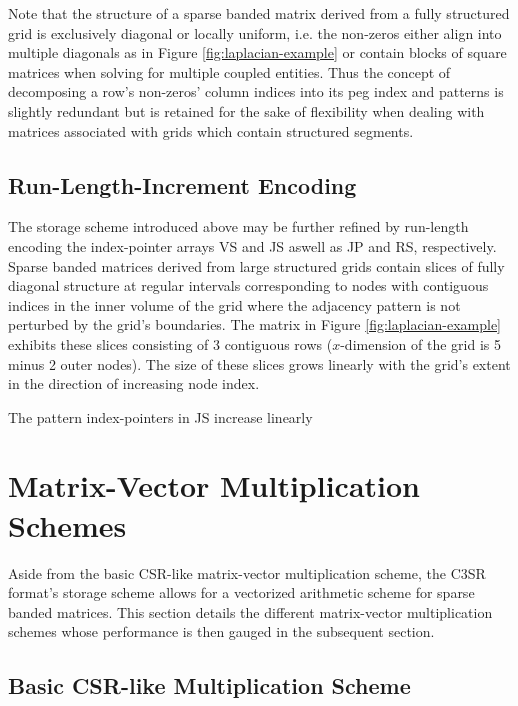     Note that the structure of a sparse banded matrix derived from a fully structured grid is exclusively diagonal or
    locally uniform, i.e. the non-zeros either align into multiple diagonals as in Figure \ref{fig:laplacian-example} or
    contain blocks of square matrices when solving for multiple coupled entities. Thus the concept of decomposing a
    row's non-zeros' column indices into its peg index and patterns is slightly redundant but is retained for the sake
    of flexibility when dealing with matrices associated with grids which contain structured segments.

    \subsection{Run-Length-Increment Encoding}

      The storage scheme introduced above may be further refined by run-length encoding the index-pointer arrays VS and
      JS aswell as JP and RS, respectively. Sparse banded matrices derived from large structured grids contain slices of
      fully diagonal structure at regular intervals corresponding to nodes with contiguous indices in the inner volume
      of the grid where the adjacency pattern is not perturbed by the grid's boundaries. The matrix in Figure
      \ref{fig:laplacian-example} exhibits these slices consisting of 3 contiguous rows ($x$-dimension of the grid is 5
      minus 2 outer nodes). The size of these slices grows linearly with the grid's extent in the direction of
      increasing node index.

      The pattern index-pointers in JS increase linearly

  \section{Matrix-Vector Multiplication Schemes} \label{subsec:matrix-vector-multiplication-schemes}

    Aside from the basic CSR-like matrix-vector multiplication scheme, the C3SR format's storage scheme allows for a
    vectorized arithmetic scheme for sparse banded matrices. This section details the different matrix-vector
    multiplication schemes whose performance is then gauged in the subsequent section.

    \subsection{Basic CSR-like Multiplication Scheme} \label{subsubsec:basic-csr-like-multiplication-scheme}

